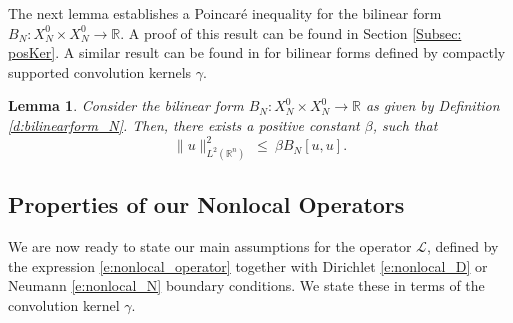 \documentclass[11pt]{amsart}   	%
\theoremstyle{plain}
\numberwithin{equation}{section}
\newtheorem{lemma}[thm]{Lemma}
\def\R{\mathbb{R}}
\begin{document}
The next lemma establishes a Poincar{\'e} inequality for the bilinear form $B_N: X^0_N \times X^0_N \longrightarrow \R$.
A proof of this result can be found in Section \ref{Subsec: posKer}. A similar result can be found in \cite{mengesha2013analysis} for bilinear forms defined by compactly supported convolution kernels $\gamma$.

\begin{lemma}\label{l:Poincare}
Consider the bilinear form $B_N: X^0_N \times X^0_N \longrightarrow \R$ as given by Definition  \ref{d:bilinearform_N}. Then, there exists a positive constant $\beta$, such that
\[ \| u\|^2_{L^2(\R^n)} \ \leq \ \beta B_N[u,u].\]
\end{lemma}



\subsection{Properties of our Nonlocal Operators} \label{ss:properties_nonlocal_op}
We are now ready to state our main assumptions for the operator $\mathcal{L}$, defined by the expression \eqref{e:nonlocal_operator} together with Dirichlet \eqref{e:nonlocal_D} or Neumann \eqref{e:nonlocal_N} boundary conditions.
We state these in terms of the convolution kernel $\gamma$. 
\end{document}
